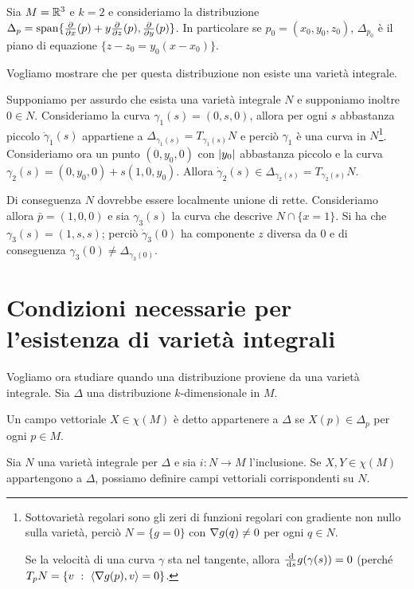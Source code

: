 \begin{example}
	Sia $M=\mathbb R^3$ e $k=2$ e consideriamo la distribuzione $\Delta_p=\mathrm{span}\{\frac{\partial }{\partial x}(p)+y\frac{\partial }{\partial z}(p),\frac{\partial }{\partial y}(p)\}$.
	In particolare se $p_0=(x_0,y_0,z_0)$, $\Delta_{p_0}$ è il piano di equazione $\{z-z_0=y_0(x-x_0)\}$.
	
	Vogliamo mostrare che per questa distribuzione non esiste una varietà integrale.
	
	Supponiamo per assurdo che esista una varietà integrale $N$ e supponiamo inoltre $0\in N$.
	Consideriamo la curva $\gamma_1(s)=(0,s,0)$, allora per ogni $s$ abbastanza piccolo $\dot\gamma_1(s)$ appartiene a $\Delta_{\gamma_1(s)}=T_{\gamma_1(s)}N$ e perciò $\gamma_1$ è una curva in $N$\footnote{Sottovarietà regolari sono gli zeri di funzioni regolari con gradiente non nullo sulla varietà, perciò $N=\{g=0\}$ con $\nabla g(q)\ne 0$ per ogni $q\in N$.
	
	Se la velocità di una curva $\gamma$ sta nel tangente, allora $\frac{\,\mathrm d}{\,\mathrm d s}g(\gamma(s))=0$ (perché $T_pN=\{v\ : \ \langle\nabla g(p),v\rangle =0\}$.}.
	Consideriamo ora un punto $(0,y_0,0)$ con $\lvert y_0\rvert$ abbastanza piccolo e la curva $\gamma_2(s)=(0,y_0,0)+s(1,0,y_0)$. Allora $\dot\gamma_2(s)\in\Delta_{\gamma_2(s)}=T_{\gamma_2(s)}N$.
	
	Di conseguenza $N$ dovrebbe essere localmente unione di rette. Consideriamo allora $\bar p=(1,0,0)$ e sia $\gamma_3(s)$ la curva che descrive $N\cap\{x=1\}$.
	Si ha che $\gamma_3(s)=(1,s,s)$; perciò $\dot\gamma_3(0)$ ha componente $z$ diversa da 0 e di conseguenza $\gamma_3(0)\ne \Delta_{\gamma_3(0)}$.
\end{example}

\section{Condizioni necessarie per l'esistenza di varietà integrali}

Vogliamo ora studiare quando una distribuzione proviene da una varietà integrale.
Sia $\Delta$ una distribuzione $k$-dimensionale in $M$.

\begin{definition}
	Un campo vettoriale $X\in\chi(M)$ è detto appartenere a $\Delta$ se $X(p)\in\Delta_p$ per ogni $p\in M$.
\end{definition}

Sia $N$ una varietà integrale per $\Delta$ e sia $i:N \to M$ l'inclusione.
Se $X,Y\in\chi(M)$ appartengono a $\Delta$, possiamo definire campi vettoriali corrispondenti su $N$.

